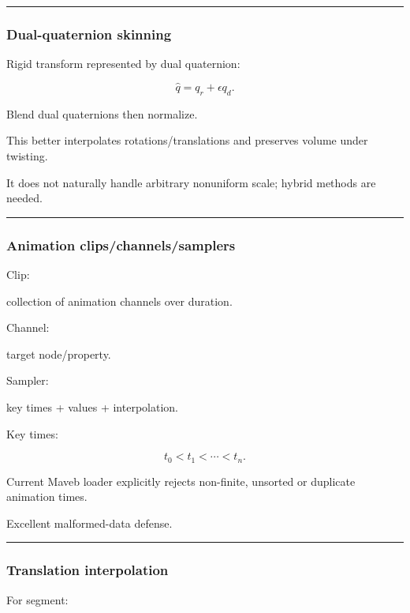 \begin{center}\rule{0.5\linewidth}{0.5pt}\end{center}

\subsubsection{Dual-quaternion skinning}\label{dual-quaternion-skinning}

Rigid transform represented by dual quaternion:

\[
\hat q=
q_r+
\epsilon q_d.
\]

Blend dual quaternions then normalize.

This better interpolates rotations/translations and preserves volume under twisting.

It does not naturally handle arbitrary nonuniform scale; hybrid methods are needed.

\begin{center}\rule{0.5\linewidth}{0.5pt}\end{center}

\subsubsection{Animation clips/channels/samplers}\label{animation-clipschannelssamplers}

Clip:

collection of animation channels over duration.

Channel:

target node/property.

Sampler:

key times + values + interpolation.

Key times:

\[
t_0<t_1<\cdots<t_n.
\]

Current Maveb loader explicitly rejects non-finite, unsorted or duplicate animation times.

Excellent malformed-data defense.

\begin{center}\rule{0.5\linewidth}{0.5pt}\end{center}

\subsubsection{Translation interpolation}\label{translation-interpolation}

For segment:

